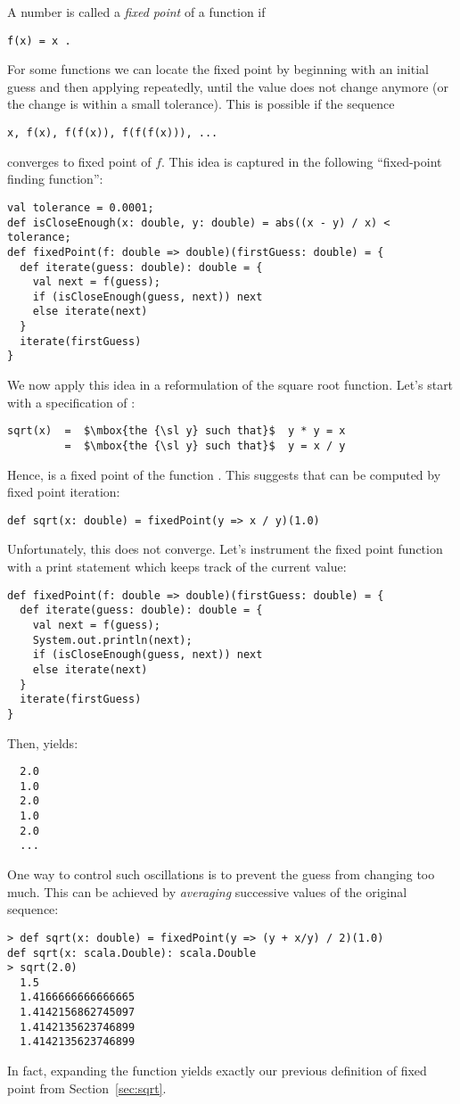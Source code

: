 A number  is called a {\em fixed point} of a function  if
\begin{lstlisting}
f(x) = x .
\end{lstlisting}
For some functions  we can locate the fixed point by beginning
with an initial guess and then applying  repeatedly, until the
value does not change anymore (or the change is within a small
tolerance). This is possible if the sequence
\begin{lstlisting}
x, f(x), f(f(x)), f(f(f(x))), ...
\end{lstlisting}
converges to fixed point of $f$. This idea is captured in
the following ``fixed-point finding function'':
\begin{lstlisting}
val tolerance = 0.0001;
def isCloseEnough(x: double, y: double) = abs((x - y) / x) < tolerance;
def fixedPoint(f: double => double)(firstGuess: double) = {
  def iterate(guess: double): double = {
    val next = f(guess);
    if (isCloseEnough(guess, next)) next
    else iterate(next)
  }
  iterate(firstGuess)
}
\end{lstlisting}
We now apply this idea in a reformulation of the square root function.
Let's start with a specification of :
\begin{lstlisting}
sqrt(x)  =  $\mbox{the {\sl y} such that}$  y * y = x
         =  $\mbox{the {\sl y} such that}$  y = x / y
\end{lstlisting}
Hence,  is a fixed point of the function .
This suggests that  can be computed by fixed point iteration:
\begin{lstlisting}
def sqrt(x: double) = fixedPoint(y => x / y)(1.0)
\end{lstlisting}
Unfortunately, this does not converge. Let's instrument the fixed point
function with a print statement which keeps track of the current
 value:
\begin{lstlisting}
def fixedPoint(f: double => double)(firstGuess: double) = {
  def iterate(guess: double): double = {
    val next = f(guess);
    System.out.println(next);
    if (isCloseEnough(guess, next)) next
    else iterate(next)
  }
  iterate(firstGuess)
}
\end{lstlisting}
Then,  yields:
\begin{lstlisting}
  2.0
  1.0
  2.0
  1.0
  2.0
  ...
\end{lstlisting}
One way to control such oscillations is to prevent the guess from changing too much. 
This can be achieved by {\em averaging} successive values of the original sequence:
\begin{lstlisting}
> def sqrt(x: double) = fixedPoint(y => (y + x/y) / 2)(1.0)
def sqrt(x: scala.Double): scala.Double
> sqrt(2.0)
  1.5
  1.4166666666666665
  1.4142156862745097
  1.4142135623746899
  1.4142135623746899
\end{lstlisting}
In fact, expanding the  function yields exactly our 
previous definition of fixed point from Section~\ref{sec:sqrt}.

